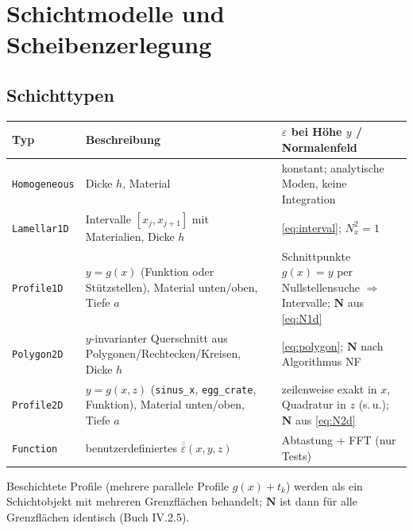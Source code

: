 \section{Schichtmodelle und Scheibenzerlegung}\label{sec:layers}

\subsection{Schichttypen}
\begin{center}
\small
\begin{tabular}{p{3.2cm}p{4.7cm}p{6.2cm}}
\toprule
Typ & Beschreibung & $\varepsilon$ bei Höhe $y$ / Normalenfeld \\
\midrule
\verb|Homogeneous| & Dicke $h$, Material & konstant; analytische Moden, keine Integration \\
\verb|Lamellar1D| & Intervalle $[x_j,x_{j+1}]$ mit Materialien, Dicke $h$ & \eqref{eq:interval}; $N_x^2=1$ \\
\verb|Profile1D| & $y=g(x)$ (Funktion oder Stützstellen), Material unten/oben, Tiefe $a$ &
 Schnittpunkte $g(x)=y$ per Nullstellensuche $\Rightarrow$ Intervalle; $\mathbf N$ aus \eqref{eq:N1d} \\
\verb|Polygon2D| & $y$-invarianter Querschnitt aus Polygonen/Rechtecken/Kreisen, Dicke $h$ &
 \eqref{eq:polygon}; $\mathbf N$ nach Algorithmus NF \\
\verb|Profile2D| & $y=g(x,z)$ (\verb|sinus_x|, \verb|egg_crate|, Funktion), Material unten/oben, Tiefe $a$ &
 zeilenweise exakt in $x$, Quadratur in $z$ (s.\,u.); $\mathbf N$ aus \eqref{eq:N2d} \\
\verb|Function| & benutzerdefiniertes $\overline{\overline\varepsilon}(x,y,z)$ & Abtastung + FFT (nur Tests) \\
\bottomrule
\end{tabular}
\end{center}
Beschichtete Profile (mehrere parallele Profile $g(x)+t_k$) werden als ein Schichtobjekt mit mehreren
Grenzflächen behandelt; $\mathbf N$ ist dann für alle Grenzflächen identisch (Buch IV.2.5).

